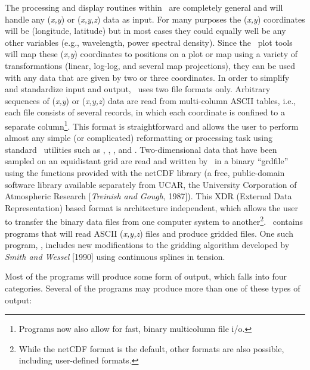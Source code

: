 The processing and display routines within \GMT\ are completely general
and will handle any ({\it x,y}) or ({\it x,y,z}) data as input.
For many purposes the ({\it x,y}) coordinates will be (longitude,
latitude) but in most cases they could equally well be any other
variables (e.g., wavelength, power spectral density).  Since the \GMT\
plot tools will map these ({\it x,y}) coordinates to positions on a
plot or map using a variety of transformations (linear, log-log, and
several map projections), they can be used with any data that are
given by two or three coordinates.  In order to simplify and standardize
input and output, \GMT\ uses two file formats only.  Arbitrary sequences
of ({\it x,y}) or ({\it x,y,z}) data are read from multi-column ASCII
tables, i.e., each file consists of several records, in which each
coordinate is confined to a separate column\footnote{Programs now also
allow for fast, binary multicolumn file i/o.}.  This format is
straightforward and allows the user to perform almost any simple
(or complicated) reformatting or processing task using standard
\UNIX\ utilities such as , , ,
\progname{sed} and \progname{awk}.
Two-dimensional data that have been sampled on an equidistant grid are
read and written by \GMT\ in a binary ``grdfile'' using the functions
provided with the netCDF\index{netCDF} library (a free, public-domain software
library available separately from UCAR, the University Corporation
of Atmospheric Research [{\it Treinish and Gough}, 1987]).  This XDR
(External Data Representation) based format is architecture independent,
which allows the user to transfer the binary data files from one
computer system to another\footnote{While the netCDF format is the default,
other formats are also possible, including user-defined formats.}.
\GMT\ contains programs that will read ASCII
({\it x,y,z}) files and produce gridded files.  One such program,
\GMTprog{surface}, includes new modifications to the gridding algorithm
developed by {\it Smith and Wessel} [1990] using continuous splines
in tension. 

Most of the programs will produce some form of output, which falls
into four categories.  Several of the programs may produce more than
one of these types of output:\par 

